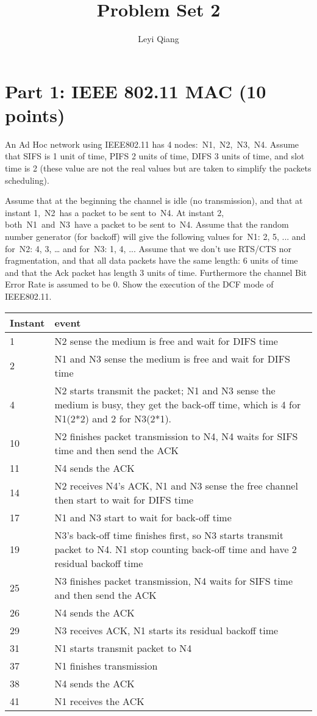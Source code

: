 \documentclass{article}
\author{Leyi Qiang}
\title{Problem Set 2}
\begin{document}
 
	\section{Part 1: IEEE 802.11 MAC (10 points)}
	An Ad Hoc network using IEEE802.11 has 4 nodes: N1, N2, N3, N4. Assume that SIFS is 1 unit of time, PIFS 2 units of time, DIFS 3 units of time, and slot time is 2 (these value are not the real values but are taken to simplify the packets scheduling).

Assume that at the beginning the channel is idle (no transmission), and that at instant 1, N2 has a packet to be sent to N4. At instant 2, both N1 and N3 have a packet to be sent to N4. Assume that the random number generator (for backoff) will give the following values for N1: 2, 5, ... and for N2: 4, 3, … and for N3: 1, 4, ... Assume that we don’t use RTS/CTS nor fragmentation, and that all data packets have the same length: 6 units of time and that the Ack packet has length 3 units of time. Furthermore the channel Bit Error Rate is assumed to be 0. Show the execution of the DCF mode of IEEE802.11. \\ 


 \begin{center}
	\begin{tabular}{|p{1cm}|p{10cm}|}
		\hline
		Instant & event \\
		\hline
		1 & N2 sense the medium is free and wait for DIFS time \\
		\hline
    2 &  N1 and N3 sense the medium is free and wait for DIFS time \\
		\hline
    4 & N2 starts transmit the packet; N1 and N3 sense the medium is busy, they get the back-off time, which is 4 for N1(2*2) and 2 for N3(2*1). \\
		\hline
		10 & N2 finishes packet transmission to N4, N4 waits for SIFS time and then send the ACK \\
		\hline
    11 &  N4 sends the ACK \\
		\hline
    14 & N2 receives N4’s ACK, N1 and N3 sense the free channel then start to wait for DIFS time \\
		\hline
    17 &  N1 and N3 start to wait for back-off time \\
		\hline
    19 &  N3’s back-off time finishes first, so N3 starts transmit packet to N4. N1 stop counting back-off time and have 2 residual backoff time \\
		\hline
		25 & N3 finishes packet transmission, N4 waits for SIFS time and then send the ACK \\
		\hline
		26 & N4 sends the ACK \\
		\hline
    29 & N3 receives ACK, N1 starts its residual backoff time \\
		\hline
		31 & N1 starts transmit packet to N4 \\
		\hline
		37 & N1 finishes transmission \\
		\hline
		38 & N4 sends the ACK \\
		\hline
	  41 & N1 receives the ACK \\
		\hline
	\end{tabular}
 \end{center}
\end{document}
